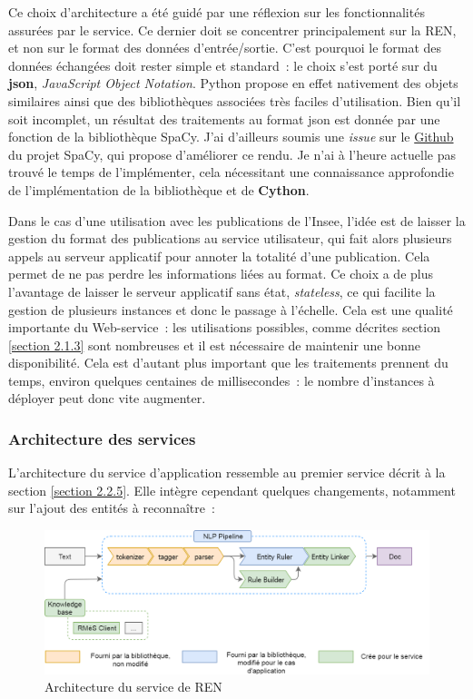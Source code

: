 Ce choix d'architecture a été guidé par une réflexion sur les fonctionnalités assurées par le service. Ce dernier doit se concentrer principalement sur la REN, et non sur le format des données d'entrée/sortie. C'est pourquoi le format des données échangées doit rester simple et standard~: le choix s'est porté sur du \textbf{json}, \textit{JavaScript Object Notation}. Python propose en effet nativement des objets similaires ainsi que des bibliothèques associées très faciles d'utilisation. Bien qu'il soit incomplet, un résultat des traitements au format json est donnée par une fonction de la bibliothèque SpaCy. J'ai d'ailleurs soumis une \textit{issue} sur le \href{https://github.com/explosion/spaCy/issues/3987}{Github} \cite{spacy-issue} du projet SpaCy, qui propose d'améliorer ce rendu. Je n'ai à l'heure actuelle pas trouvé le temps de l'implémenter, cela nécessitant une connaissance approfondie de l'implémentation de la bibliothèque et de \textbf{Cython}.

Dans le cas d'une utilisation avec les publications de l'Insee, l'idée est de laisser la gestion du format des publications au service utilisateur, qui fait alors plusieurs appels au serveur applicatif pour annoter la totalité d'une publication. Cela permet de ne pas perdre les informations liées au format. Ce choix a de plus l'avantage de laisser le serveur applicatif sans état, \textit{stateless}, ce qui facilite la gestion de plusieurs instances et donc le passage à l'échelle. Cela est une qualité importante du Web-service~: les utilisations possibles, comme décrites section \ref{section 2.1.3} sont nombreuses et il est nécessaire de maintenir une bonne disponibilité. Cela est d'autant plus important que les traitements prennent du temps, environ quelques centaines de millisecondes~: le nombre d'instances à déployer peut donc vite augmenter.
\newline
\label{section 3.2.1}

\subsubsection*{Architecture des services}
L'architecture du service d'application ressemble au premier service décrit à la section \ref{section 2.2.5}. Elle intègre cependant quelques changements, notamment sur l'ajout des entités à reconnaître~:
\vspace{10pt}
\begin{figure}[H]
    \centering
    \includegraphics[scale=0.36]{images/InspaCy-archi.png}
    \caption{Architecture du service de REN}
    \label{fig:inspacy-archi}
\end{figure}
\vspace{10pt}


